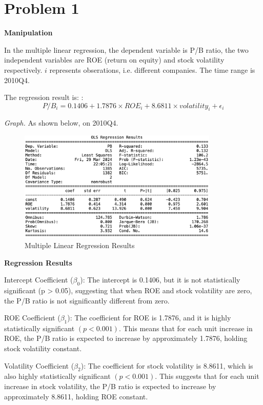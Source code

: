 \noindent
\section*{Problem 1}

\noindent
\textbf{Manipulation}

In the multiple linear regression, the dependent variable is P/B ratio, the two independent variables are ROE (return on equity) and stock volatility respectively. $i$ represents obserations, i.e. different companies. The time range is 2010Q4. 

The regression result is: : $$P/B_i = 0.1406 + 1.7876 \times ROE_i + 8.6811 \times volatility_i + \epsilon_i$$


\noindent
\textit{Graph.} As shown below, on 2010Q4.
\vspace{5cm}

\begin{figure}[t]
\centering
\includegraphics[width=0.85\textwidth]{data/q1_result.png}
\caption{Multiple Linear Regression Results}
\label{fig:example}
\end{figure}


\noindent
\textbf{Regression Results}

Intercept Coefficient (\( \beta_0 \)): The intercept is 0.1406, but it is not statistically significant (p > 0.05), suggesting that when ROE and stock volatility are zero, the P/B ratio is not significantly different from zero.

ROE Coefficient (\( \beta_1 \)): The coefficient for ROE is 1.7876, and it is highly statistically significant $(p < 0.001)$. This means that for each unit increase in ROE, the P/B ratio is expected to increase by approximately 1.7876, holding stock volatility constant.

Volatility Coefficient (\( \beta_2 \)): The coefficient for stock volatility is 8.8611, which is also highly statistically significant $(p < 0.001)$. This suggests that for each unit increase in stock volatility, the P/B ratio is expected to increase by approximately 8.8611, holding ROE constant.

